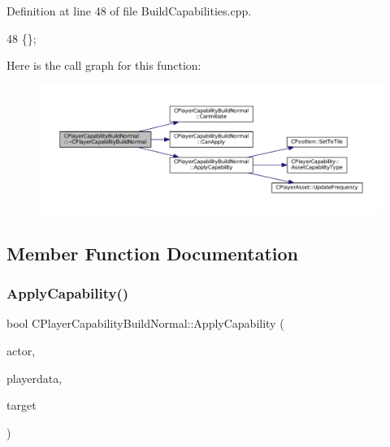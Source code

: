 Definition at line 48 of file Build\+Capabilities.\+cpp.


\begin{DoxyCode}
48 \{\};
\end{DoxyCode}
Here is the call graph for this function\+:\nopagebreak
\begin{figure}[H]
\begin{center}
\leavevmode
\includegraphics[width=350pt]{classCPlayerCapabilityBuildNormal_aed39be621a98ed6d1aaf470cd5bf1ff5_cgraph}
\end{center}
\end{figure}


\subsection{Member Function Documentation}
\hypertarget{classCPlayerCapabilityBuildNormal_afc2fbda17580385a4028d44cd03c9149}{}\label{classCPlayerCapabilityBuildNormal_afc2fbda17580385a4028d44cd03c9149} 
\subsubsection{\texorpdfstring{Apply\+Capability()}{ApplyCapability()}}
{\footnotesize\ttfamily bool C\+Player\+Capability\+Build\+Normal\+::\+Apply\+Capability (\begin{DoxyParamCaption}\item[{std\+::shared\+\_\+ptr$<$ \hyperlink{classCPlayerAsset}{C\+Player\+Asset} $>$}]{actor,  }\item[{std\+::shared\+\_\+ptr$<$ \hyperlink{classCPlayerData}{C\+Player\+Data} $>$}]{playerdata,  }\item[{std\+::shared\+\_\+ptr$<$ \hyperlink{classCPlayerAsset}{C\+Player\+Asset} $>$}]{target }\end{DoxyParamCaption})\hspace{0.3cm}{\ttfamily [virtual]}}



